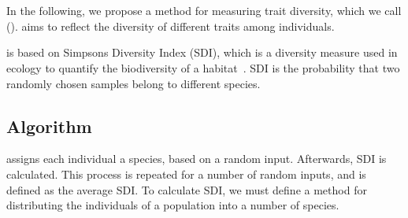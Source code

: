 \section{\di{}}\label{sec:nntd}
In the following, we propose a method for measuring trait diversity, which we call \emph{\di{}} (\dia). \dia{} aims to reflect the diversity of different traits among individuals. 

\dia{} is based on Simpsons Diversity Index (SDI), which is a diversity measure used in ecology to quantify the biodiversity of a habitat~\cite{simpson1949measurement}. SDI is the probability that two randomly chosen samples belong to different species\cite{Venturi2007182}.

\subsection{Algorithm}
\dia{} assigns each individual a species, based on a random input. Afterwards, SDI is calculated. This process is repeated for a number of random inputs, and \dia{} is defined as the average SDI. To calculate SDI, we must define a method for distributing the individuals of a population into a number of species.

